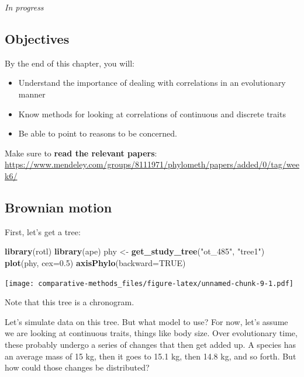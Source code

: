 \documentclass[
]{article}
\newenvironment{Shaded}{\begin{snugshade}}{\end{snugshade}}
\newcommand{\DataTypeTok}[1]{\textcolor[rgb]{0.13,0.29,0.53}{#1}}
\newcommand{\FloatTok}[1]{\textcolor[rgb]{0.00,0.00,0.81}{#1}}
\newcommand{\KeywordTok}[1]{\textcolor[rgb]{0.13,0.29,0.53}{\textbf{#1}}}
\newcommand{\NormalTok}[1]{#1}
\newcommand{\OtherTok}[1]{\textcolor[rgb]{0.56,0.35,0.01}{#1}}
\newcommand{\StringTok}[1]{\textcolor[rgb]{0.31,0.60,0.02}{#1}}
\providecommand{\tightlist}{%
  \setlength{\itemsep}{0pt}\setlength{\parskip}{0pt}}
\begin{document}
\emph{In progress}

\hypertarget{objectives-3}{%
\subsection{Objectives}\label{objectives-3}}

By the end of this chapter, you will:

\begin{itemize}
\tightlist
\item
  Understand the importance of dealing with correlations in an evolutionary manner
\item
  Know methods for looking at correlations of continuous and discrete traits
\item
  Be able to point to reasons to be concerned.
\end{itemize}

Make sure to \textbf{read the relevant papers}: \url{https://www.mendeley.com/groups/8111971/phylometh/papers/added/0/tag/week6/}

\hypertarget{brownian-motion}{%
\subsection{Brownian motion}\label{brownian-motion}}

First, let's get a tree:

\begin{Shaded}
\begin{Highlighting}[]
\KeywordTok{library}\NormalTok{(rotl)}
\KeywordTok{library}\NormalTok{(ape)}
\NormalTok{phy <{-}}\StringTok{ }\KeywordTok{get\_study\_tree}\NormalTok{(}\StringTok{"ot\_485"}\NormalTok{, }\StringTok{"tree1"}\NormalTok{)}
\KeywordTok{plot}\NormalTok{(phy, }\DataTypeTok{cex=}\FloatTok{0.5}\NormalTok{)}
\KeywordTok{axisPhylo}\NormalTok{(}\DataTypeTok{backward=}\OtherTok{TRUE}\NormalTok{)}
\end{Highlighting}
\end{Shaded}

\texttt{[image: comparative-methods\_files/figure-latex/unnamed-chunk-9-1.pdf]}

Note that this tree is a chronogram.

Let's simulate data on this tree. But what model to use? For now, let's assume we are looking at continuous traits, things like body size. Over evolutionary time, these probably undergo a series of changes that then get added up. A species has an average mass of 15 kg, then it goes to 15.1 kg, then 14.8 kg, and so forth. But how could those changes be distributed?
\end{document}
